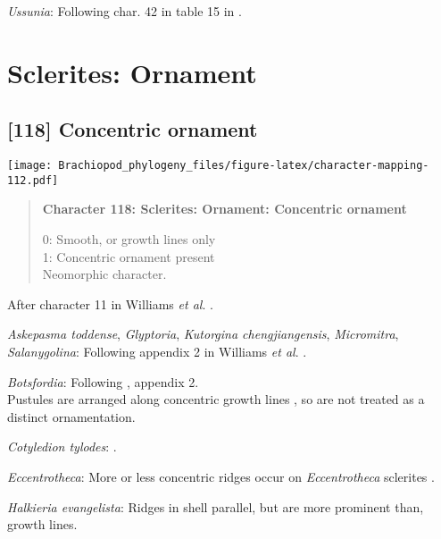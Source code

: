 \documentclass[openany]{book}
\theoremstyle{definition}
\theoremstyle{definition}
\theoremstyle{definition}
\theoremstyle{remark}
\begin{document}
\hypertarget{Ussunia-coding-117}{}
\emph{Ussunia}: Following char. 42 in table 15 in
\citet{Williams2000LinguliformeaCraniiformea}.

\section{Sclerites: Ornament}\label{sclerites-ornament}

\subsection*{{[}118{]} Concentric ornament}\label{concentric-ornament}

\texttt{[image: Brachiopod\_phylogeny\_files/figure-latex/character-mapping-112.pdf]}

\begin{quote}
\textbf{Character 118: Sclerites: Ornament: Concentric ornament}

0: Smooth, or growth lines only\\
1: Concentric ornament present\\
Neomorphic character.
\end{quote}

After character 11 in Williams \emph{et al}.
\citeyearpar{Williams1998Thediversity}.

\hypertarget{Askepasma_toddense-coding-118}{}
\emph{Askepasma toddense}, \emph{Glyptoria}, \emph{Kutorgina
chengjiangensis}, \emph{Micromitra}, \emph{Salanygolina}: Following
appendix 2 in Williams \emph{et al}.
\citeyearpar{Williams1998Thediversity}.

\hypertarget{Botsfordia-coding-118}{}
\emph{Botsfordia}: Following \citet{Williams1998Thediversity}, appendix
2.\\
Pustules are arranged along concentric growth lines
\citep{Skovsted2005EarlyCambrian}, so are not treated as a distinct
ornamentation.

\hypertarget{Cotyledion_tylodes-coding-118}{}
\emph{Cotyledion tylodes}: \citet{Zhang2013}.

\hypertarget{Eccentrotheca-coding-118}{}
\emph{Eccentrotheca}: More or less concentric ridges occur on
\emph{Eccentrotheca} sclerites
\citep{Skovsted2011Scleritomeconstruction}.

\hypertarget{Halkieria_evangelista-coding-118}{}
\emph{Halkieria evangelista}: Ridges in shell parallel, but are more
prominent than, growth lines.
\end{document}
